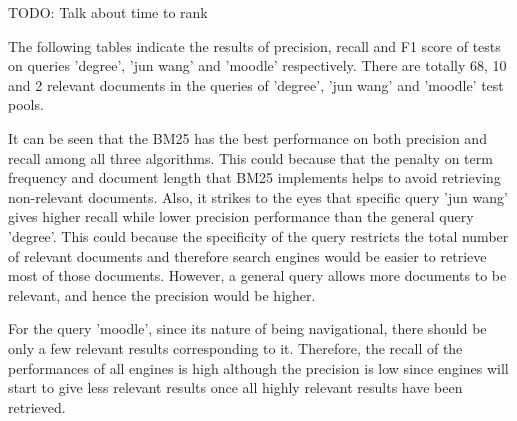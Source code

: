 TODO: Talk about time to rank

The following tables indicate the results of precision, recall and F1 score of tests on queries 'degree', 'jun wang' and 'moodle' respectively. There are totally 68, 10 and 2 relevant documents in the queries of 'degree', 'jun wang' and 'moodle' test pools. 

It can be seen that the BM25 has the best performance on both precision and recall among all three algorithms. This could because that the penalty on term frequency and document length that BM25 implements helps to avoid retrieving non-relevant documents. Also, it strikes to the eyes that specific query 'jun wang' gives higher recall while lower precision performance than the general query 'degree'. This could because the specificity of the query restricts the total number of relevant documents and therefore search engines would be easier to retrieve most of those documents. However, a general query allows more documents to be relevant, and hence the precision would be higher. 

For the query 'moodle', since its nature of being navigational, there should be only a few relevant results corresponding to it. Therefore, the recall of the performances of all engines is high although the precision is low since engines will start to give less relevant results once all highly relevant results have been retrieved.

